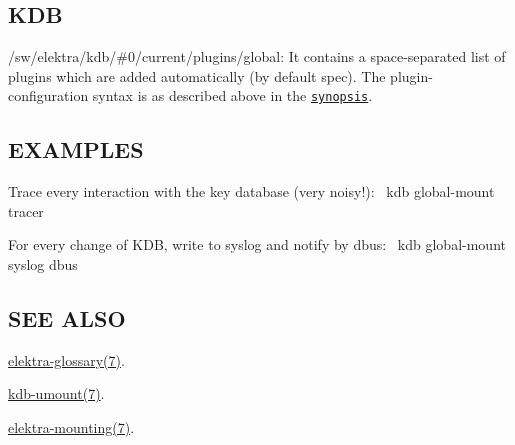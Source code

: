 \subsection*{K\+DB}


\begin{DoxyItemize}
\item {\ttfamily /sw/elektra/kdb/\#0/current/plugins/global}\+: It contains a space-\/separated list of plugins which are added automatically (by default {\ttfamily spec}). The plugin-\/configuration syntax is as described above in the \href{#SYNOPSIS}{\tt synopsis}.
\end{DoxyItemize}

\subsection*{E\+X\+A\+M\+P\+L\+ES}

Trace every interaction with the key database (very noisy!)\+:~\newline
 {\ttfamily kdb global-\/mount tracer}

For every change of K\+DB, write to syslog and notify by dbus\+:~\newline
 {\ttfamily kdb global-\/mount syslog dbus}

\subsection*{S\+EE A\+L\+SO}


\begin{DoxyItemize}
\item \hyperlink{md_doc_help_elektra-glossary_doc_help_elektra-glossary_md}{elektra-\/glossary(7)}.
\item \hyperlink{md_doc_help_kdb-umount_doc_help_kdb-umount_md}{kdb-\/umount(7)}.
\item \hyperlink{md_doc_help_elektra-mounting_doc_help_elektra-mounting_md}{elektra-\/mounting(7)}. 
\end{DoxyItemize}